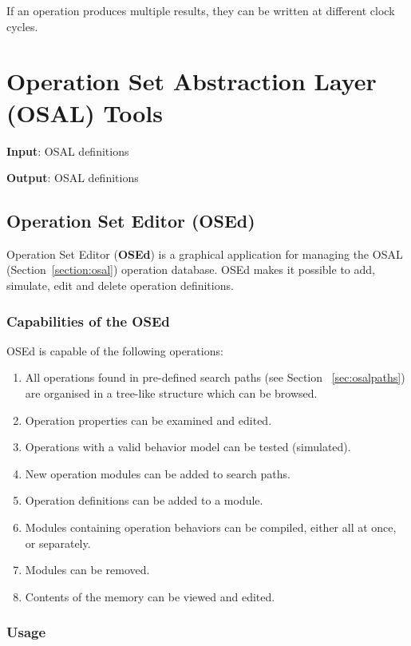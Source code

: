 \documentclass[twoside]{tceusermanual}
\begin{document}
If an operation produces multiple results, they can be written at different
clock cycles.

\section{Operation Set Abstraction Layer (OSAL) Tools}
\label{sec:osalTools}

 
\textbf{Input}: OSAL definitions 

\textbf{Output}: OSAL definitions

\subsection{Operation Set Editor (OSEd)}
\label{sec:osed}

Operation Set Editor (\textbf{OSEd}) is a graphical application for managing
the OSAL (Section~\ref{section:osal}) operation database. OSEd makes it possible
to add, simulate, edit and delete operation definitions. 

\subsubsection{Capabilities of the OSEd}

OSEd is capable of the following operations:

\begin{enumerate}
\item%
  All operations found in pre-defined search paths (see Section
  ~\ref{sec:osalpaths}) are organised in a tree-like structure which can be
  browsed.
\item%
  Operation properties can be examined and edited.
\item%
  Operations with a valid behavior model can be tested (simulated).
\item%
  New operation modules can be added to search paths.
\item%
  Operation definitions can be added to a module.
\item%
  Modules containing operation behaviors can be compiled, either all at
  once, or separately.
\item%
  Modules can be removed.
\item%
  Contents of the memory can be viewed and edited.
\end{enumerate}

\subsubsection{Usage}
\end{document}
